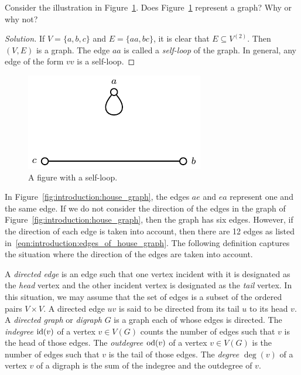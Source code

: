 \begin{example}
Consider the illustration in
Figure~\ref{fig:introduction:self_loop}. Does
Figure~\ref{fig:introduction:self_loop} represent a graph? Why or why
not?
\end{example}

\begin{proof}[Solution]
If $V = \{ a, b, c \}$ and $E = \{ aa, bc \}$, it is clear that $E
\subseteq V^{(2)}$. Then $(V, E)$ is a graph. The edge $aa$ is
called a \emph{self-loop} of the graph. In general,
any edge of the form $vv$ is a self-loop.
\end{proof}

\begin{figure}[!htbp]
\centering
\includegraphics{image/introduction/self-loop}
\caption{A figure with a self-loop.}
\label{fig:introduction:self_loop}
\end{figure}

In Figure~\ref{fig:introduction:house_graph}, the edges $ae$ and $ea$
represent one and the same edge. If we do not consider the direction
of the edges in the graph of
Figure~\ref{fig:introduction:house_graph}, then the graph has six
edges. However, if the direction of each edge is taken into account,
then there are 12 edges as listed
in~\eqref{eqn:introduction:edges_of_house_graph}. The following
definition captures the situation where the direction of the edges are
taken into account.

A \emph{directed edge} is an edge such that one
vertex incident with it is designated as the
\emph{head} vertex and the other incident vertex is
designated as the \emph{tail} vertex. In this
situation, we may assume that the set of edges is a subset of the
ordered pairs $V \times V$. A directed edge $uv$ is said to be
directed from its tail $u$ to its head $v$. A
\emph{directed graph} or
\emph{digraph} $G$ is a graph each of whose edges is
directed. The \emph{indegree} $\operatorname*{id}(v)$\index{$\id$} of
a vertex $v \in V(G)$ counts the number of edges such that $v$ is the
head of those edges. The \emph{outdegree}
$\operatorname*{od}(v)$\index{$\od$} of a vertex $v \in V(G)$ is the number of edges
such that $v$ is the tail of those edges. The
\emph{degree} $\deg(v)$\index{$\deg$} of a vertex $v$ of
a digraph is the sum of the indegree and the outdegree of $v$.

